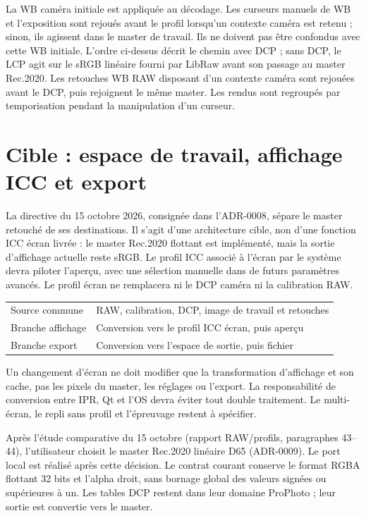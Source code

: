 La WB caméra initiale est appliquée au décodage. Les curseurs manuels de WB
et l'exposition sont rejoués avant le profil lorsqu'un contexte caméra est
retenu ; sinon, ils agissent dans le master de travail. Ils ne doivent pas être
confondus avec cette WB initiale. L'ordre ci-dessus décrit le chemin avec DCP ;
sans DCP, le LCP agit sur le sRGB linéaire fourni par LibRaw avant son passage
au master Rec.2020. Les retouches WB RAW disposant d'un contexte caméra sont
rejouées avant le DCP, puis rejoignent le même master. Les rendus sont
regroupés par temporisation pendant la manipulation d'un curseur.

\section{Cible : espace de travail, affichage ICC et export}

La directive du 15 octobre 2026, consignée dans l'ADR-0008, sépare le master
retouché de ses destinations. Il s'agit d'une architecture cible, non d'une
fonction ICC écran livrée : le master Rec.2020 flottant est implémenté,
mais la sortie d'affichage actuelle reste sRGB.
Le profil ICC associé à l'écran par le système devra piloter l'aperçu, avec
une sélection manuelle dans de futurs paramètres avancés. Le profil écran
ne remplacera ni le DCP caméra ni la calibration RAW.

\begin{center}
\begin{tabular}{ll}
Source commune & RAW, calibration, DCP, image de travail et retouches \\
Branche affichage & Conversion vers le profil ICC écran, puis aperçu \\
Branche export & Conversion vers l'espace de sortie, puis fichier
\end{tabular}
\end{center}

Un changement d'écran ne doit modifier que la transformation d'affichage
et son cache, pas les pixels du master, les réglages ou l'export. La
responsabilité de conversion entre IPR, Qt et l'OS devra éviter tout double
traitement. Le multi-écran, le repli sans profil et l'épreuvage restent à spécifier.

Après l'étude comparative du 15 octobre (rapport RAW/profils, paragraphes
43--44), l'utilisateur choisit le master Rec.2020 linéaire D65 (ADR-0009).
Le port local est réalisé après cette décision. Le contrat courant
conserve le format RGBA flottant 32 bits et l'alpha droit, sans bornage global
des valeurs signées ou supérieures à un. Les tables DCP restent dans leur
domaine ProPhoto ; leur sortie est convertie vers le master.

